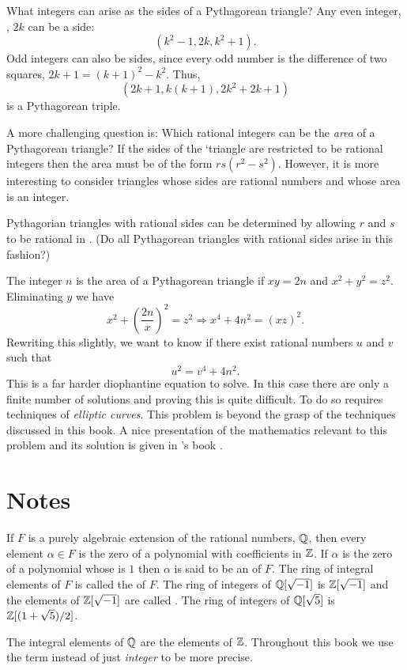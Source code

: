 What integers can arise as the sides of a Pythagorean triangle?  Any
even integer, \eg, $2k$ can be a side:
\[
(k^2 - 1 , 2k, k^2+1).
\]
Odd integers can also be sides, since every odd number is the difference
of two squares, $2k+1 = (k+1)^2 - k^2$.  Thus,
\[
(2k+1, k(k+1), 2k^2+2k +1)
\]
is a Pythagorean triple.

A more challenging question is: Which rational integers can be the
{\em area} of a Pythagorean triangle?  If the sides of the `triangle
are restricted to be rational integers then the area must be of the
form $rs(r^2-s^2)$.  However, it is more interesting to consider
triangles whose sides are rational numbers and whose area is an
integer.

Pythagorian triangles with rational sides can be determined by
allowing $r$ and $s$ to be rational in .  (Do
all Pythagorean triangles with rational sides arise in this fashion?)

The integer $n$ is the area of a Pythagorean triangle if $xy = 2n$ and
$x^2 +y^2 = z^2$.  Eliminating $y$ we have
\[
x^2 + \left(\frac{2n}{x}\right)^2 = z^2 \Longrightarrow x^4 + 4n^2 =
(xz)^2.
\]
Rewriting this slightly, we want to know if there exist rational
numbers $u$ and $v$ such that
\begin{equation}\label{Euclid:Cong:Eq}
u^2 = v^4 + 4n^2.
\end{equation}
This is a far harder diophantine equation to solve.  In this case
there are only a finite number of solutions and proving this is quite
difficult.  To do so requires techniques of {\em elliptic
curves}. This problem is beyond the grasp of the
techniques discussed in this book.  A nice presentation of the
mathematics relevant to this problem and its solution is given in
{\Koblitz}'s book \cite{Koblitz:Elliptic}.

\section*{Notes}

\small

If $F$ is a purely algebraic extension of the rational numbers, $\mathbb{Q}$,
then every element $\alpha \in F$ is the zero of a polynomial with
coefficients in $\mathbb{Z}$.  If $\alpha$ is the zero of a polynomial whose
 is $1$ then $\alpha$ is said to be an
 of $F$.  The ring of integral elements of $F$
is called the  of $F$.  The ring of integers of
$\mathbb{Q}[\sqrt{-1}]$ is $\mathbb{Z}[\sqrt{-1}]$ and the elements of $\mathbb{Z}[\sqrt{-1}]$
are called .  The ring of integers of
$\mathbb{Q}[\sqrt{5}]$ is $\mathbb{Z}[(1+\sqrt{5})/2]$.

The integral elements of $\mathbb{Q}$ are the elements of $\mathbb{Z}$.  Throughout
this book we use the term  instead of just {\em
integer} to be more precise.

\normalsize
